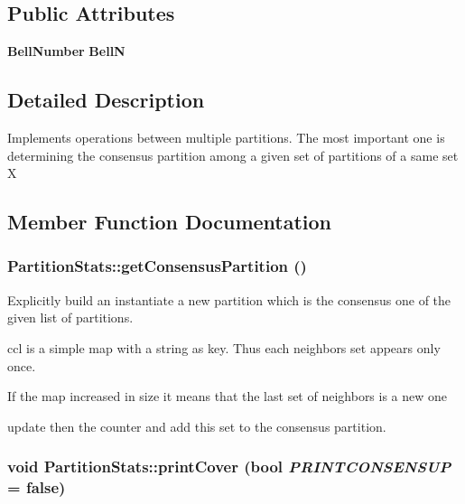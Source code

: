 \subsection*{Public Attributes}
\begin{CompactItemize}
\item 
{\bf Bell\-Number} {\bf Bell\-N}\label{classPartitionStats_o0}

\end{CompactItemize}


\subsection{Detailed Description}
Implements operations between multiple partitions. The most important one is determining the consensus partition among a given set of partitions of a same set X 



\subsection{Member Function Documentation}
\subsubsection{ Partition\-Stats::get\-Consensus\-Partition ()}\label{classPartitionStats_a6}


Explicitly build an instantiate a new partition which is the consensus one of the given list of partitions. 

ccl is a simple map with a string as key. Thus each neighbors set appears only once.

If the map increased in size it means that the last set of neighbors is a new one

update then the counter and add this set to the consensus partition. 
\subsubsection{\setlength{\rightskip}{0pt plus 5cm}void Partition\-Stats::print\-Cover (bool {\em PRINTCONSENSUP} = false)}\label{classPartitionStats_a4}


